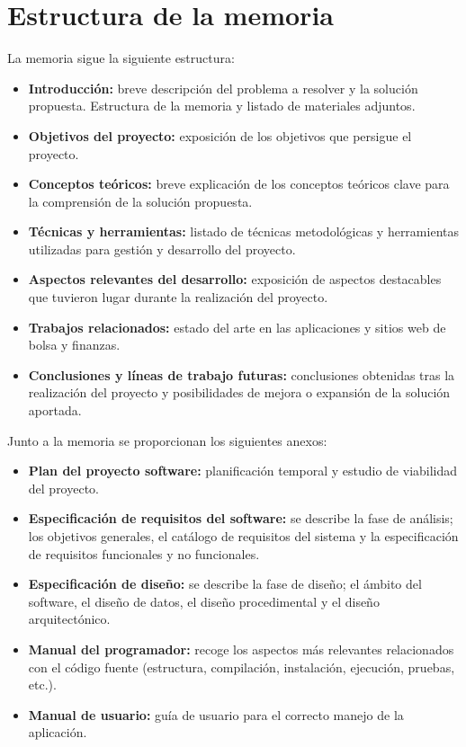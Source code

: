 \section{Estructura de la memoria}\label{estructura-de-la-memoria}

La memoria sigue la siguiente estructura:

\begin{itemize}
\tightlist
\item
  \textbf{Introducción:} breve descripción del problema a resolver y la
  solución propuesta. Estructura de la memoria y listado de materiales
  adjuntos.
\item
  \textbf{Objetivos del proyecto:} exposición de los objetivos que
  persigue el proyecto.
\item
  \textbf{Conceptos teóricos:} breve explicación de los conceptos
  teóricos clave para la comprensión de la solución propuesta.
\item
  \textbf{Técnicas y herramientas:} listado de técnicas metodológicas y
  herramientas utilizadas para gestión y desarrollo del proyecto.
\item
  \textbf{Aspectos relevantes del desarrollo:} exposición de aspectos
  destacables que tuvieron lugar durante la realización del proyecto.
\item
  \textbf{Trabajos relacionados:} estado del arte en las aplicaciones y sitios web de bolsa y finanzas.
\item
  \textbf{Conclusiones y líneas de trabajo futuras:} conclusiones
  obtenidas tras la realización del proyecto y posibilidades de mejora o
  expansión de la solución aportada.
\end{itemize}

Junto a la memoria se proporcionan los siguientes anexos:

\begin{itemize}
\tightlist
\item
  \textbf{Plan del proyecto software:} planificación temporal y estudio
  de viabilidad del proyecto.
\item
  \textbf{Especificación de requisitos del software:} se describe la
  fase de análisis; los objetivos generales, el catálogo de requisitos
  del sistema y la especificación de requisitos funcionales y no
  funcionales.
\item
  \textbf{Especificación de diseño:} se describe la fase de diseño; el
  ámbito del software, el diseño de datos, el diseño procedimental y el
  diseño arquitectónico.
\item
  \textbf{Manual del programador:} recoge los aspectos más relevantes
  relacionados con el código fuente (estructura, compilación,
  instalación, ejecución, pruebas, etc.).
\item
  \textbf{Manual de usuario:} guía de usuario para el correcto manejo de
  la aplicación.
\end{itemize}

